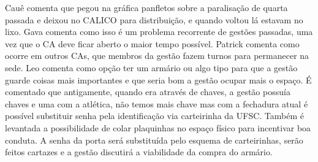 \documentclass{ata-calico}
\begin{document}
Cauê comenta que pegou na gráfica panfletos sobre a paralisação de quarta passada e deixou no CALICO para distribuição, e quando voltou lá estavam no lixo. Gava comenta como isso é um problema recorrente de gestões passadas, uma vez que o CA deve ficar aberto o maior tempo possível. Patrick comenta como ocorre em outros CAs, que membros da gestão fazem turnos para permanecer na sede. Leo comenta como opção ter um armário ou algo tipo para que a gestão guarde coisas mais importantes e que seria bom a gestão ocupar mais o espaço. É comentado que antigamente, quando era através de chaves, a gestão possuía chaves e uma com a atlética, não temos mais chave mas com a fechadura atual é possível substituir senha pela identificação via carteirinha da UFSC. Também é levantada a possibilidade de colar plaquinhas no espaço físico para incentivar boa conduta.
\bigbreak
A senha da porta será substituída pelo esquema de carteirinhas, serão feitos cartazes e a gestão discutirá a viabilidade da compra do armário.

\end{document}
